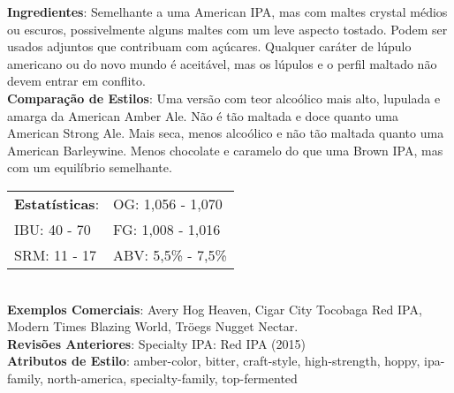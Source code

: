 \textbf{Ingredientes}: Semelhante a uma American IPA, mas com maltes crystal médios ou escuros, possivelmente alguns maltes com um leve aspecto tostado. Podem ser usados adjuntos que contribuam com açúcares. Qualquer caráter de lúpulo americano ou do novo mundo é aceitável, mas os lúpulos e o perfil maltado não devem entrar em conflito. \\
\textbf{Comparação de Estilos}: Uma versão com teor alcoólico mais alto, lupulada e amarga da American Amber Ale. Não é tão maltada e doce quanto uma American Strong Ale. Mais seca, menos alcoólico e não tão maltada quanto uma American Barleywine. Menos chocolate e caramelo do que uma Brown IPA, mas com um equilíbrio semelhante. \\
\begin{tabular}{@{}p{35mm}p{35mm}@{}}
  \textbf{Estatísticas}: & OG: 1,056 - 1,070 \\
  IBU: 40 - 70  & FG: 1,008 - 1,016 \\
  SRM: 11 - 17  & ABV: 5,5\% - 7,5\%
\end{tabular}\\
\textbf{Exemplos Comerciais}: Avery Hog Heaven, Cigar City Tocobaga Red IPA, Modern Times Blazing World, Tröegs Nugget Nectar. \\
\textbf{Revisões Anteriores}: Specialty IPA: Red IPA (2015) \\
\textbf{Atributos de Estilo}: amber-color, bitter, craft-style, high-strength, hoppy, ipa-family, north-america, specialty-family, top-fermented

